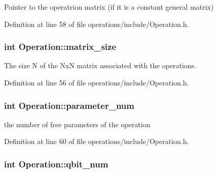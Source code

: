 Pointer to the operatrion matrix (if it is a constant general matrix) 



Definition at line 58 of file operations/include/\+Operation.\+h.

\subsubsection[{\texorpdfstring{matrix\+\_\+size}{matrix_size}}]{\setlength{\rightskip}{0pt plus 5cm}int Operation\+::matrix\+\_\+size\hspace{0.3cm}{\ttfamily [protected]}}\hypertarget{class_operation_a8236c07112cb165a00d3869363808624}{}\label{class_operation_a8236c07112cb165a00d3869363808624}


The size N of the NxN matrix associated with the operations. 



Definition at line 56 of file operations/include/\+Operation.\+h.

\subsubsection[{\texorpdfstring{parameter\+\_\+num}{parameter_num}}]{\setlength{\rightskip}{0pt plus 5cm}int Operation\+::parameter\+\_\+num\hspace{0.3cm}{\ttfamily [protected]}}\hypertarget{class_operation_aa57505afe5b5ec27f6d053044b86e043}{}\label{class_operation_aa57505afe5b5ec27f6d053044b86e043}


the number of free parameters of the operation 



Definition at line 60 of file operations/include/\+Operation.\+h.

\subsubsection[{\texorpdfstring{qbit\+\_\+num}{qbit_num}}]{\setlength{\rightskip}{0pt plus 5cm}int Operation\+::qbit\+\_\+num\hspace{0.3cm}{\ttfamily [protected]}}\hypertarget{class_operation_aecd5fbf1dd4ea532b2e58471ff8bad69}{}\label{class_operation_aecd5fbf1dd4ea532b2e58471ff8bad69}


